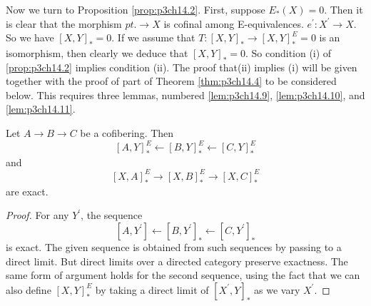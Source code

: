\documentclass[../main]{subfiles}
\begin{document}
Now we turn to Proposition \ref{prop:p3ch14.2}. First, suppose $E_{\ast}(X)=0$. Then it is clear that the morphism $pt. \to X$ is cofinal among E-equivalences. $e^{\prime}\colon X^{\prime} \to X$. So we have $ \left[X,Y\right]_{\ast} = 0$. If we assume that $T\colon \left[X,Y\right]_{\ast} \to \left[X,Y\right]^E_{\ast}=0$ is an isomorphism, then clearly we deduce that $ \left[X,Y\right]_{\ast}=0$. So condition (i) of \ref{prop:p3ch14.2} implies condition (ii). The proof that(ii) implies (i) will be given together with the proof of part of Theorem \ref{thm:p3ch14.4} to be considered below. This requires three lemmas, numbered \ref{lem:p3ch14.9}, \ref{lem:p3ch14.10}, and \ref{lem:p3ch14.11}. 
\begin{lemma} \label{lem:p3ch14.9}
Let $A \to B \to C$ be a cofibering. Then
$$
  \left[A,Y\right]^E_{\ast} \longleftarrow \left[B,Y\right]^E_{\ast} \longleftarrow \left[C,Y\right]^E_{\ast}
$$ 
and
$$
  \left[X,A\right]^E_{\ast} \to \left[X,B\right]^E_{\ast} \to  \left[X,C\right]^E_{\ast}
$$ 
are exact.
\begin{proof} 
   For any $Y^{\prime}$, the sequence 
   $$
     \left[A,Y^{\prime}\right] \longleftarrow \left[B,Y^{\prime}\right]_{\ast} \longleftarrow \left[C,Y^{\prime}\right]_{\ast}
   $$ 
   is exact. The given sequence is obtained from such sequences by passing to a direct limit. But direct limits over a directed category preserve exactness. The same form of argument holds for the second sequence, using the fact that we can also define $ \left[X,Y\right]^E_{\ast}$ by taking a direct limit of $ \left[X^{\prime},Y\right]_{\ast}$ as we vary $X^{\prime}$.
\end{proof}
\end{lemma}
\end{document}
